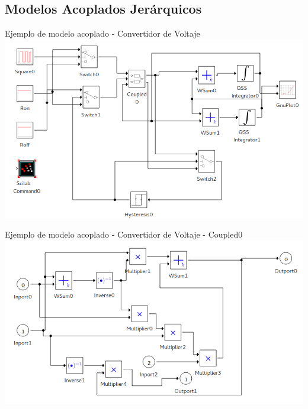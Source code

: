 \documentclass[10pt,presentation]{beamer}
\begin{document}
	\subsection{Modelos Acoplados Jerárquicos }

\begin{frame}[fragile]{Ejemplo de modelo acoplado - Convertidor de Voltaje}
        \includegraphics[width=\linewidth]{buck_disk}
\end{frame}

\begin{frame}{Ejemplo de modelo acoplado - Convertidor de Voltaje - Coupled0}
        \includegraphics[width=\linewidth]{buck_disk_coupled0}
\end{frame}
\end{document}
